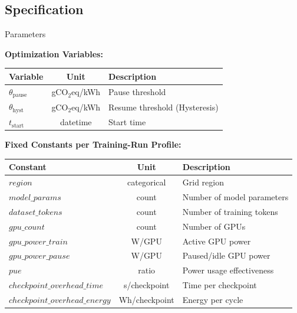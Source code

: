 \subsection{Specification}

\begin{frame}[t]{Parameters}{}

  \small

  \textbf{Optimization Variables:}
  \newline
  \begin{tabular}{l|c|l}
    \toprule
    Variable & Unit & Description \\
    \midrule
    $\theta_{\text{pause}}$ & gCO$_2$eq/kWh & Pause threshold \\
    $\theta_{\text{hyst}}$ & gCO$_2$eq/kWh & Resume threshold (Hysteresis) \\
    $t_{\text{start}}$ & datetime & Start time \\
    \bottomrule
  \end{tabular}%

  \vspace{1cm}

  \textbf{Fixed Constants per Training-Run Profile:}
  \newline
  \begin{tabular}{l|c|l}
    \toprule
    Constant & Unit & Description \\
    \midrule
    $\mathit{region}$ & categorical & Grid region \\
    $\mathit{model\_params}$ & count & Number of model parameters \\
    $\mathit{dataset\_tokens}$ & count & Number of training tokens \\
    $\mathit{gpu\_count}$ & count & Number of GPUs \\
    $\mathit{gpu\_power\_train}$ & W/GPU & Active GPU power \\
    $\mathit{gpu\_power\_pause}$ & W/GPU & Paused/idle GPU power \\
    $\mathit{pue}$ & ratio & Power usage effectiveness \\
    $\mathit{checkpoint\_overhead\_time}$ & s/checkpoint & Time per
    checkpoint \\
    $\mathit{checkpoint\_overhead\_energy}$ & Wh/checkpoint & Energy
    per cycle \\
    \bottomrule
  \end{tabular}%

\end{frame}
